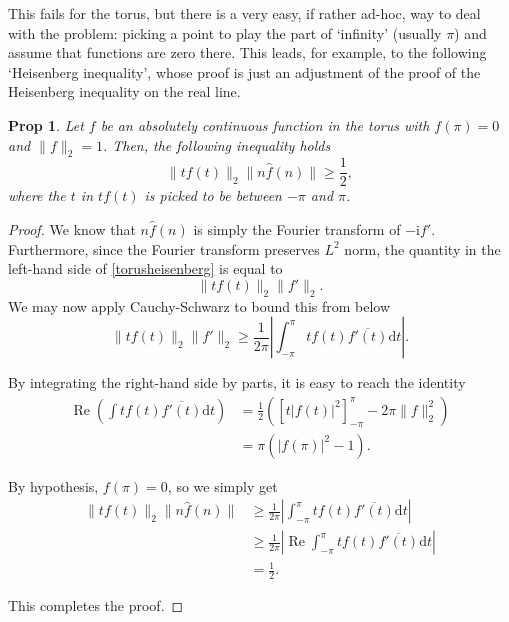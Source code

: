 \documentclass{amsart}
\newcommand{\dd}{\mathrm{d}}
\newcommand{\I}{\mathrm{i}}
\DeclareMathOperator{\re}{Re}
\newtheorem{prop}{Prop}
\begin{document}
This fails for the torus, but there is a very easy, if rather ad-hoc, way to deal with the problem: picking a point to play the part of `infinity' (usually $\pi$) and assume that functions are zero there. This leads, for example, to the following `Heisenberg inequality', whose proof is just an adjustment of the proof of the Heisenberg inequality on the real line.

\begin{prop}\label{propheisenbergtorus}
Let $f$ be an absolutely continuous function in the torus with $f(\pi) = 0$ and $\lVert f \rVert_2 = 1$. Then, the following inequality holds
\begin{equation}\label{torusheisenberg}
\lVert t f(t) \rVert_2 \lVert n \hat f(n) \rVert \geq \frac12,
\end{equation}
where the $t$ in $t f(t)$ is picked to be between $-\pi$ and $\pi$.
\end{prop}

\begin{proof}
We know that $n \hat f(n)$ is simply the Fourier transform of $- \I f'$. Furthermore, since the Fourier transform preserves $L^2$ norm, the quantity in the left-hand side of \eqref{torusheisenberg} is equal to
\[ \lVert t f(t) \rVert_2 \lVert f' \rVert_2.\]
We may now apply Cauchy-Schwarz to bound this from below
\[ \lVert t f(t) \rVert_2 \lVert f' \rVert_2 \geq \frac1{2 \pi} \left\lvert \int_{-\pi}^\pi t f(t) \overline{f'(t)} \dd t \right\rvert.\]

By integrating the right-hand side by parts, it is easy to reach the identity
\begin{align*}
\re\left( \int t f(t) \overline{f'(t)} \dd t \right) &= \frac12 \left( [t \lvert f(t) \rvert^2 ]_{-\pi}^\pi - 2 \pi \lVert f \rVert_2^2 \right)\\
&= \pi ( \lvert f(\pi) \rvert^2 - 1 ).
\end{align*}

By hypothesis, $f(\pi) = 0$, so we simply get
\begin{align*}
\lVert t f(t) \rVert_2 \lVert n \hat f(n) \rVert &\geq \frac1{2 \pi} \left\lvert \int_{-\pi}^\pi t f(t) \overline{f'(t)} \dd t \right\rvert\\
&\geq \frac1{2 \pi} \left\lvert \re \int_{-\pi}^\pi t f(t) \overline{f'(t)} \dd t \right\rvert\\
&= \frac12.
\end{align*}

This completes the proof.
\end{proof}
\end{document}
